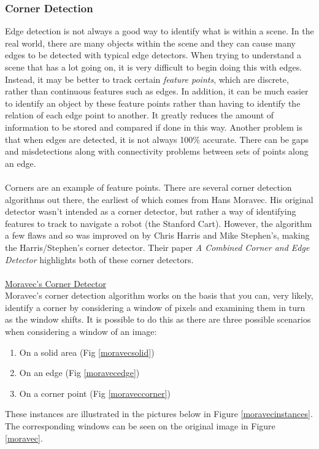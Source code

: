 \documentclass[11pt]{article}
\begin{document}
\subsubsection{Corner Detection}
Edge detection is not always a good way to identify what is within a scene.
In the real world, there are many objects within the scene and they can
cause many edges to be detected with typical edge detectors. When trying
to understand a scene that has a lot going on, it is very difficult
to begin doing this with edges. Instead, it may be better to track certain
\textit{feature points}, which are discrete, rather than continuous features
such as edges. In addition, it can be much easier to identify an object by
these feature points rather than having to identify the relation of each
edge point to another. It greatly reduces the amount of information to be
stored and compared if done in this way. Another problem is that when
edges are detected, it is not always 100\% accurate. There can be gaps
and misdetections along with connectivity problems between sets of points
along an edge.\\
\\
Corners are an example of feature points. There are several corner detection
algorithms out there, the earliest of which comes from Hans Moravec. His
original detector wasn't intended as a corner detector, but rather a way
of identifying features to track to navigate a robot (the Stanford Cart).
However, the algorithm a few flaws and so was improved on by Chris Harris
and Mike Stephen's, making the Harris/Stephen's corner detector. Their 
paper \textit{A Combined Corner and Edge Detector}\cite{Harris88} 
highlights both of these corner detectors.\\
\\
\underline{Moravec's Corner Detector}\\
Moravec's corner detection algorithm works on the basis that you can,
very likely, identify a corner by considering a window of pixels and
examining them in turn as the window shifts. It is possible to do this
as there are three possible scenarios when considering a window of an image:
\begin{enumerate}
	\item On a solid area (Fig \ref{moravecsolid})
	\item On an edge (Fig \ref{moravecedge})
	\item On a corner point (Fig \ref{moraveccorner})
\end{enumerate}

These instances are illustrated in the pictures below in 
Figure \ref{moravecinstances}. The corresponding windows can be seen on the
original image in Figure \ref{moravec}.
\end{document}
